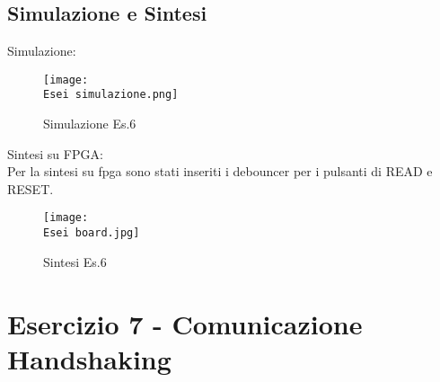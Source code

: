 \documentclass[12pt]{article}
\def \Esei {Allegati/Esercizio6/}
\begin{document}
\subsection{Simulazione e Sintesi}
Simulazione:
\begin{figure}[ht!]
    \centering
    \texttt{[image: \\Esei simulazione.png]}
    \caption{Simulazione Es.6}
\end{figure}
\clearpage
Sintesi su FPGA:
\\Per la sintesi su fpga sono stati inseriti i debouncer per i pulsanti di READ e RESET.
\begin{figure}[ht!]
    \texttt{[image: \\Esei board.jpg]}
    \caption{Sintesi Es.6}
\end{figure}
\clearpage
\section{Esercizio 7 - Comunicazione Handshaking}
\end{document}
